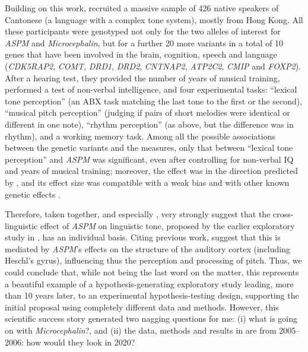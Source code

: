 \documentclass[twoside,onecolumn]{article}
\begin{document}
Building on this work, \citet{wong_sciadv_2020} recruited a massive sample of 426 native speakers of Cantonese (a language with a complex tone system), mostly from Hong Kong.
All these participants were genotyped not only for the two alleles of interest for \textit{ASPM} and \textit{Microcephalin}, but for a further 20 more variants in a total of 10 genes that have been involved in the brain, cognition, speech and language (\textit{CDK5RAP2}, \textit{COMT}, \textit{DRD1}, \textit{DRD2}, \textit{CNTNAP2}, \textit{ATP2C2}, \textit{CMIP} and \textit{FOXP2}).
After a hearing test, they provided the number of years of musical training, performed a test of non-verbal intelligence, and four experimental tasks: ``lexical tone perception'' (an ABX task matching the last tone to the first or the second), ``musical pitch perception'' (judging if pairs of short melodies were identical or different in one note), ``rhythm perception'' (as above, but the difference was in rhythm), and a working memory task.
Among all the possible associations between the genetic variants and the measures, only that between ``lexical tone perception'' and \textit{ASPM} was significant, even after controlling for non-verbal IQ and years of musical training; moreover, the effect was in the direction predicted by \citet{dediu_language_2017}, and its effect size was compatible with a weak bias and with other known genetic effects \citep{wong_sciadv_2020}.

Therefore, taken together, \citet{wong_plosone_2012} and especially \citet{wong_sciadv_2020}, very strongly suggest that the cross-linguistic effect of \textit{ASPM} on linguistic tone, proposed by the earlier exploratory study in \citet{dediu_language_2017}, has an individual basis.
Citing previous work, \citet{wong_sciadv_2020} suggest that this is mediated by \textit{ASPM}'s effects on the structure of the auditory cortex (including Heschl’s gyrus), influencing thus the perception and processing of pitch.
Thus, we could conclude that, while not being the last word on the matter, this represents a beautiful example of a hypothesis-generating exploratory study leading, more than 10 years later, to an experimental hypothesis-testing design, supporting the initial proposal using completely different data and methods.
However, this scientific success story generated two nagging questions for me: (i) what is going on with \textit{Microcephalin}?, and (ii) the data, methods and results in \citet{dediu_ladd_2007} are from 2005--2006: how would they look in 2020?
\end{document}
